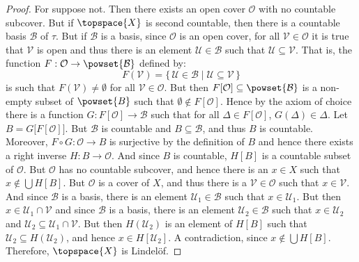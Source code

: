 \documentclass{article}                                                        %
\begin{document}
        \begin{proof}
            For suppose not. Then there exists an open cover $\mathcal{O}$ with
            no countable subcover. But if $\topspace{X}$ is second countable,
            then there is a countable basis $\mathcal{B}$ of $\tau$. But if
            $\mathcal{B}$ is a basis, since $\mathcal{O}$ is an open cover, for
            all $\mathcal{V}\in\mathcal{O}$ it is true that $\mathcal{V}$ is
            open and thus there is an element $\mathcal{U}\in\mathcal{B}$ such
            that $\mathcal{U}\subseteq\mathcal{V}$. That is, the function
            $F:\mathcal{O}\rightarrow\powset{\mathcal{B}}$ defined by:
            \begin{equation}
                F(\mathcal{V})=\{\,\mathcal{U}\in\mathcal{B}\;|\;
                    \mathcal{U}\subseteq\mathcal{V}\,\}
            \end{equation}
            is such that $F(\mathcal{V})\ne\emptyset$ for all
            $\mathcal{V}\in\mathcal{O}$. But then
            $F[\mathcal{O}]\subseteq\powset{\mathcal{B}}$ is a non-empty subset
            of $\powset{B}$ such that $\emptyset\notin{F}[\mathcal{O}]$. Hence
            by the axiom of choice there is a function
            $G:F[\mathcal{O}]\rightarrow\mathcal{B}$ such that for all
            $\Delta\in{F}[\mathcal{O}]$, $G(\Delta)\in\Delta$. Let
            $B=G\big[F[\mathcal{O}]\big]$. But $\mathcal{B}$ is countable and
            $B\subseteq\mathcal{B}$, and thus $B$ is countable. Moreover,
            $F\circ{G}:\mathcal{O}\rightarrow{B}$ is surjective by the
            definition of $B$ and hence there exists a right inverse
            $H:B\rightarrow\mathcal{O}$. And since $B$ is countable,
            $H[B]$ is a countable subset of $\mathcal{O}$. But $\mathcal{O}$ has
            no countable subcover, and hence there is an $x\in{X}$ such that
            $x\notin\bigcup{H}[B]$. But $\mathcal{O}$ is a cover of $X$, and
            thus there is a $\mathcal{V}\in\mathcal{O}$ such that
            $x\in\mathcal{V}$. And since $\mathcal{B}$ is a basis, there is an
            element $\mathcal{U}_{1}\in\mathcal{B}$ such that
            $x\in\mathcal{U}_{1}$. But then $x\in\mathcal{U}_{1}\cap\mathcal{V}$
            and since $\mathcal{B}$ is a basis, there is an element
            $\mathcal{U}_{2}\in\mathcal{B}$ such that $x\in\mathcal{U}_{2}$ and
            $\mathcal{U}_{2}\subseteq\mathcal{U}_{1}\cap\mathcal{V}$. But then
            $H(\mathcal{U}_{2})$ is an element of $H[B]$ such that
            $\mathcal{U}_{2}\subseteq{H}(\mathcal{U}_{2})$, and hence
            $x\in{H}[\mathcal{U}_{2}]$. A contradiction, since
            $x\notin\bigcup{H}[B]$. Therefore, $\topspace{X}$ is Lindel\"{o}f.
        \end{proof}
\end{document}
